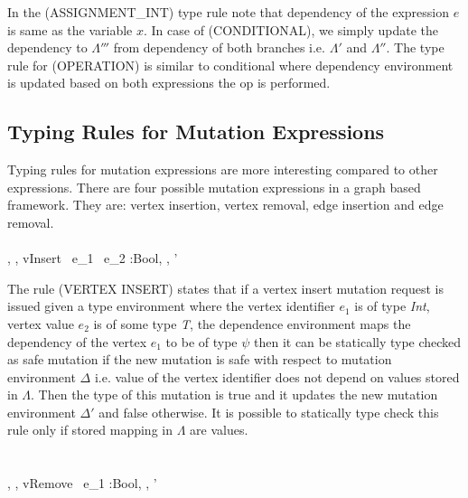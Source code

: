 In the (ASSIGNMENT\_INT) type rule note that dependency of the expression $e$ is same as the variable $x$. In case of (CONDITIONAL), we simply update the dependency to $\Lambda'''$ from dependency of both branches i.e. $\Lambda'$ and $\Lambda''$. The type rule for (OPERATION) is similar to conditional where dependency environment is updated based on both expressions the op is performed.\\    

 \subsection{Typing Rules for Mutation Expressions}
\label{subsec:standardRules}

Typing rules for mutation expressions are more interesting compared to other expressions. There are four possible mutation expressions in a graph based framework. They are: vertex insertion, vertex removal, edge insertion and edge removal. 
\ \\
\ \\
    {\Gamma, \Lambda, \Delta \vdash vInsert \ e_1 \ e_2 :Bool, \Lambda, \Delta'}

\smallskip

The rule (VERTEX INSERT) states that if a vertex insert mutation request is issued given a type environment where the vertex identifier $e_1$ is of type \emph{Int}, vertex value $e_2$ is of some type \emph{T}, the dependence environment maps the dependency of the vertex $e_1$ to be of type $\psi$ then it can be statically type checked as safe mutation if the new mutation is safe with respect to mutation environment $\Delta$ i.e. value of the vertex identifier does not depend on values stored in $\Lambda$. Then the type of this mutation is true and it updates the new mutation environment $\Delta'$ and false otherwise. It is possible to statically type check this rule only if stored mapping in $\Lambda$ are values.\\    
\ \\
\ \\    
    {\Gamma, \Lambda, \Delta \vdash vRemove \ e_1 :Bool, \Lambda, \Delta'}

